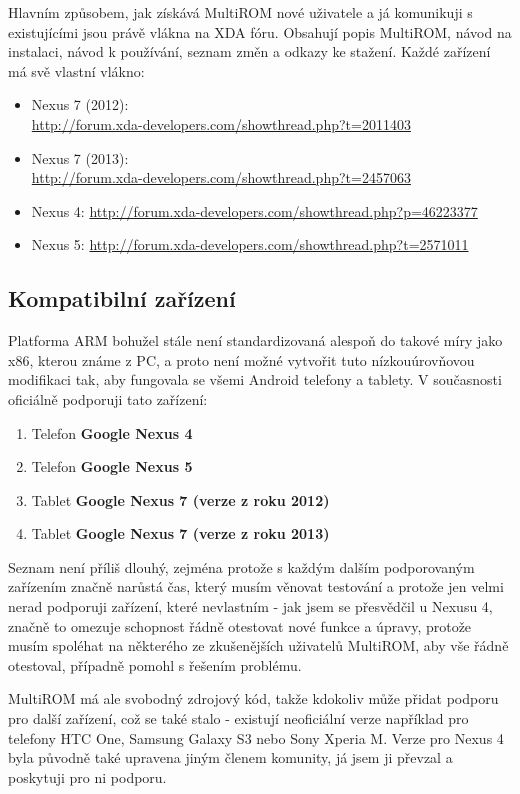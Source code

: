 \documentclass[12pt, a4paper, oneside]{article}
\newcommand{\B}{\textbf} %
\begin{document}
Hlavním způsobem, jak získává MultiROM nové uživatele a já komunikuji s existujícími jsou právě vlákna na XDA fóru. Obsahují popis MultiROM, návod na instalaci, návod k používání, seznam změn a odkazy ke stažení. Každé zařízení má svě vlastní vlákno:

\begin{itemize}
\item Nexus 7 (2012):\\ \url{http://forum.xda-developers.com/showthread.php?t=2011403}
\item Nexus 7 (2013):\\ \url{http://forum.xda-developers.com/showthread.php?t=2457063}
\item Nexus 4: \url{http://forum.xda-developers.com/showthread.php?p=46223377}
\item Nexus 5: \url{http://forum.xda-developers.com/showthread.php?t=2571011}
\end{itemize}

\subsection{Kompatibilní zařízení}
Platforma ARM bohužel stále není standardizovaná alespoň do takové míry jako x86, kterou známe z PC, a proto není možné vytvořit tuto nízkouúrovňovou modifikaci tak, aby fungovala se všemi Android telefony a tablety. V současnosti oficiálně podporuji tato zařízení:

\begin{enumerate}
    \item Telefon \B{Google Nexus 4}
    \item Telefon \B{Google Nexus 5}
    \item Tablet \B{Google Nexus 7 (verze z roku 2012)}
    \item Tablet \B{Google Nexus 7 (verze z roku 2013)}
\end{enumerate}

Seznam není příliš dlouhý, zejména protože s každým dalším podporovaným zařízením značně narůstá čas, který musím věnovat testování a protože jen velmi nerad podporuji zařízení, které nevlastním - jak jsem se přesvědčil u Nexusu 4, značně to omezuje schopnost řádně otestovat nové funkce a úpravy, protože musím spoléhat na některého ze zkušenějších uživatelů MultiROM, aby vše řádně otestoval, případně pomohl s řešením problému.

MultiROM má ale svobodný zdrojový kód, takže kdokoliv může přidat podporu pro další zařízení, což se také stalo - existují neoficiální verze například pro telefony HTC One, Samsung Galaxy S3 nebo Sony Xperia M. Verze pro Nexus 4 byla původně také upravena jiným členem komunity, já jsem ji převzal a poskytuji pro ni podporu.
\end{document}
